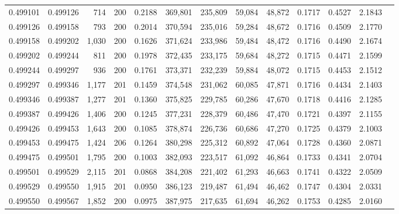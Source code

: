 \begin{tabular}{rrrrrrrrrrrrr}
0.499101 & 0.499126 &   714 & 200 &                                     0.2188 & 369,801 & 235,809 &  59,084 &  48,872 & 0.1717 & 0.4527 & 2.1843 \\
0.499126 & 0.499158 &   793 & 200 &                                     0.2014 & 370,594 & 235,016 &  59,284 &  48,672 & 0.1716 & 0.4509 & 2.1770 \\
0.499158 & 0.499202 & 1,030 & 200 &                                     0.1626 & 371,624 & 233,986 &  59,484 &  48,472 & 0.1716 & 0.4490 & 2.1674 \\
0.499202 & 0.499244 &   811 & 200 &                                     0.1978 & 372,435 & 233,175 &  59,684 &  48,272 & 0.1715 & 0.4471 & 2.1599 \\
0.499244 & 0.499297 &   936 & 200 &                                     0.1761 & 373,371 & 232,239 &  59,884 &  48,072 & 0.1715 & 0.4453 & 2.1512 \\
0.499297 & 0.499346 & 1,177 & 201 &                                     0.1459 & 374,548 & 231,062 &  60,085 &  47,871 & 0.1716 & 0.4434 & 2.1403 \\
0.499346 & 0.499387 & 1,277 & 201 &                                     0.1360 & 375,825 & 229,785 &  60,286 &  47,670 & 0.1718 & 0.4416 & 2.1285 \\
0.499387 & 0.499426 & 1,406 & 200 &                                     0.1245 & 377,231 & 228,379 &  60,486 &  47,470 & 0.1721 & 0.4397 & 2.1155 \\
0.499426 & 0.499453 & 1,643 & 200 &                                     0.1085 & 378,874 & 226,736 &  60,686 &  47,270 & 0.1725 & 0.4379 & 2.1003 \\
0.499453 & 0.499475 & 1,424 & 206 &                                     0.1264 & 380,298 & 225,312 &  60,892 &  47,064 & 0.1728 & 0.4360 & 2.0871 \\
0.499475 & 0.499501 & 1,795 & 200 &                                     0.1003 & 382,093 & 223,517 &  61,092 &  46,864 & 0.1733 & 0.4341 & 2.0704 \\
0.499501 & 0.499529 & 2,115 & 201 &                                     0.0868 & 384,208 & 221,402 &  61,293 &  46,663 & 0.1741 & 0.4322 & 2.0509 \\
0.499529 & 0.499550 & 1,915 & 201 &                                     0.0950 & 386,123 & 219,487 &  61,494 &  46,462 & 0.1747 & 0.4304 & 2.0331 \\
0.499550 & 0.499567 & 1,852 & 200 &                                     0.0975 & 387,975 & 217,635 &  61,694 &  46,262 & 0.1753 & 0.4285 & 2.0160 \\

\end{tabular}
